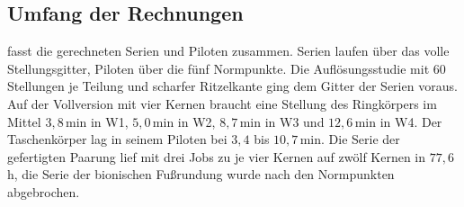 \subsection{Umfang der Rechnungen}
\label{sec:rechenumfang}

 fasst die gerechneten Serien und Piloten zusammen. Serien laufen über das volle Stellungsgitter, Piloten über die fünf Normpunkte. Die Auflösungsstudie mit 60 Stellungen je Teilung und scharfer Ritzelkante ging dem Gitter der Serien voraus. Auf der Vollversion mit vier Kernen braucht eine Stellung des Ringkörpers im Mittel $3{,}8$\,min in W1, $5{,}0$\,min in W2, $8{,}7$\,min in W3 und $12{,}6$\,min in W4. Der Taschenkörper lag in seinem Piloten bei $3{,}4$ bis $10{,}7$\,min. Die Serie der gefertigten Paarung lief mit drei Jobs zu je vier Kernen auf zwölf Kernen in $77{,}6$\,h, die Serie der bionischen Fußrundung wurde nach den Normpunkten abgebrochen.


